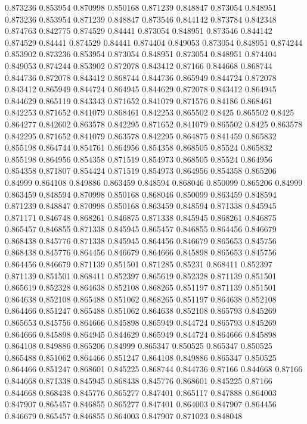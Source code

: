 0.873236 0.853954
0.870998 0.850168
0.871239 0.848847
0.873054 0.848951
0.873236 0.853954
0.871239 0.848847
0.873546 0.844142
0.873784 0.842348
0.874763 0.842775
0.874529 0.84441
0.873054 0.848951
0.873546 0.844142
0.874529 0.84441
0.874529 0.84441
0.874404 0.849053
0.873054 0.848951
0.874244 0.853902
0.873236 0.853954
0.873054 0.848951
0.873054 0.848951
0.874404 0.849053
0.874244 0.853902
0.872078 0.843412
0.87166 0.844668
0.868744 0.844736
0.872078 0.843412
0.868744 0.844736
0.865949 0.844724
0.872078 0.843412
0.865949 0.844724
0.864945 0.844629
0.872078 0.843412
0.864945 0.844629
0.865119 0.843343
0.871652 0.841079
0.871576 0.84186
0.868461 0.842253
0.871652 0.841079
0.868461 0.842253
0.865502 0.8425
0.865502 0.8425
0.864277 0.842602
0.863578 0.842295
0.871652 0.841079
0.865502 0.8425
0.863578 0.842295
0.871652 0.841079
0.863578 0.842295
0.864875 0.841459
0.865832 0.855198
0.864744 0.854761
0.864956 0.854358
0.868505 0.85524
0.865832 0.855198
0.864956 0.854358
0.871519 0.854973
0.868505 0.85524
0.864956 0.854358
0.871807 0.854424
0.871519 0.854973
0.864956 0.854358
0.865206 0.84999
0.864108 0.849886
0.863459 0.848594
0.868046 0.850099
0.865206 0.84999
0.863459 0.848594
0.870998 0.850168
0.868046 0.850099
0.863459 0.848594
0.871239 0.848847
0.870998 0.850168
0.863459 0.848594
0.871338 0.845945
0.871171 0.846748
0.868261 0.846875
0.871338 0.845945
0.868261 0.846875
0.865457 0.846855
0.871338 0.845945
0.865457 0.846855
0.864456 0.846679
0.868438 0.845776
0.871338 0.845945
0.864456 0.846679
0.865653 0.845756
0.868438 0.845776
0.864456 0.846679
0.864666 0.845898
0.865653 0.845756
0.864456 0.846679
0.871139 0.851501
0.871285 0.85231
0.868411 0.852397
0.871139 0.851501
0.868411 0.852397
0.865619 0.852328
0.871139 0.851501
0.865619 0.852328
0.864638 0.852108
0.868265 0.851197
0.871139 0.851501
0.864638 0.852108
0.865488 0.851062
0.868265 0.851197
0.864638 0.852108
0.864466 0.851247
0.865488 0.851062
0.864638 0.852108
0.865793 0.845269
0.865653 0.845756
0.864666 0.845898
0.865949 0.844724
0.865793 0.845269
0.864666 0.845898
0.864945 0.844629
0.865949 0.844724
0.864666 0.845898
0.864108 0.849886
0.865206 0.84999
0.865347 0.850525
0.865347 0.850525
0.865488 0.851062
0.864466 0.851247
0.864108 0.849886
0.865347 0.850525
0.864466 0.851247
0.868601 0.845225
0.868744 0.844736
0.87166 0.844668
0.87166 0.844668
0.871338 0.845945
0.868438 0.845776
0.868601 0.845225
0.87166 0.844668
0.868438 0.845776
0.865277 0.847401
0.865117 0.847888
0.864003 0.847907
0.865457 0.846855
0.865277 0.847401
0.864003 0.847907
0.864456 0.846679
0.865457 0.846855
0.864003 0.847907
0.871023 0.848048
